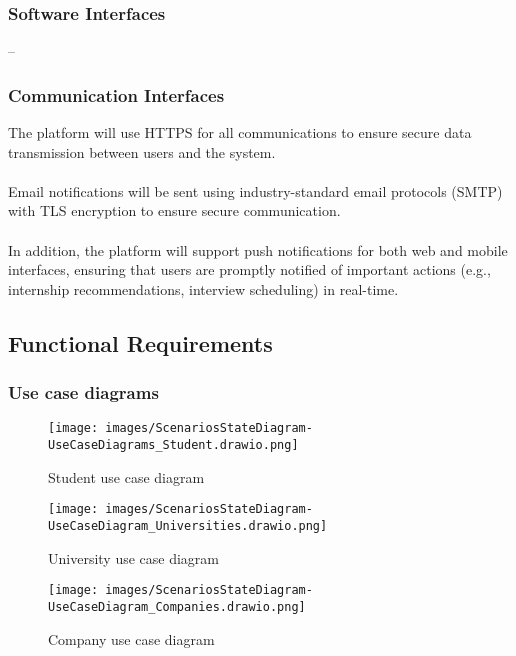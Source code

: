 \subsubsection{Software Interfaces}

--

\subsubsection{Communication Interfaces}

The platform will use HTTPS for all communications to ensure secure data transmission between users and the system.\\ \\
Email notifications will be sent using industry-standard email protocols (SMTP) with TLS encryption to ensure secure communication. \\ \\
In addition, the platform will support push notifications for both web and mobile interfaces, ensuring that users are promptly notified of important actions (e.g., internship recommendations, interview scheduling) in real-time. 
\newpage
\subsection{Functional Requirements}
\subsubsection{Use case diagrams}
\begin{figure}[ht!]
    \centering
    \texttt{[image: images/ScenariosStateDiagram-UseCaseDiagrams\_Student.drawio.png]}
    \caption{Student use case diagram}
\end{figure}

\begin{figure}[ht!]
    \centering
    \texttt{[image: images/ScenariosStateDiagram-UseCaseDiagram\_Universities.drawio.png]}
    \caption{University use case diagram}

\end{figure}

\begin{figure}[ht!]
    \centering
    \texttt{[image: images/ScenariosStateDiagram-UseCaseDiagram\_Companies.drawio.png]}
    \caption{Company use case diagram}

\end{figure}

\clearpage

